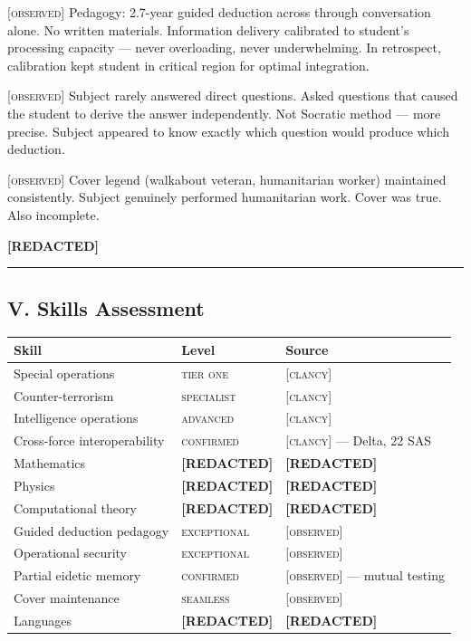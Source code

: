 \textsc{[observed]} Pedagogy: 2.7-year guided deduction across  through conversation alone. No written materials. Information delivery calibrated to student's processing capacity --- never overloading, never underwhelming. In retrospect, calibration kept student in critical region for optimal integration.

\textsc{[observed]} Subject rarely answered direct questions. Asked questions that caused the student to derive the answer independently. Not Socratic method --- more precise. Subject appeared to know exactly which question would produce which deduction.

\textsc{[observed]} Cover legend (walkabout veteran, humanitarian worker) maintained consistently. Subject genuinely performed humanitarian work. Cover was true. Also incomplete.

\textbf{[REDACTED]}

\vspace{1cm}\hrule\vspace{1cm}

\subsection*{V. Skills Assessment}
\label{record:hd-skills-assessment-2}

{%
\small
\begin{tabular}{p{4cm} p{3.5cm} p{6cm}}
\hline
\textbf{Skill} & \textbf{Level} & \textbf{Source} \\
\hline
Special operations & \textsc{tier one} & \textsc{[clancy]} \\
Counter-terrorism & \textsc{specialist} & \textsc{[clancy]} \\
Intelligence operations & \textsc{advanced} & \textsc{[clancy]} \\
Cross-force interoperability & \textsc{confirmed} & \textsc{[clancy]} --- Delta, 22 SAS \\
Mathematics & \textbf{[REDACTED]} & \textbf{[REDACTED]} \\
Physics & \textbf{[REDACTED]} & \textbf{[REDACTED]} \\
Computational theory & \textbf{[REDACTED]} & \textbf{[REDACTED]} \\
Guided deduction pedagogy & \textsc{exceptional} & \textsc{[observed]} \\
Operational security & \textsc{exceptional} & \textsc{[observed]} \\
Partial eidetic memory & \textsc{confirmed} & \textsc{[observed]} --- mutual testing \\
Cover maintenance & \textsc{seamless} & \textsc{[observed]} \\
Languages & \textbf{[REDACTED]} & \textbf{[REDACTED]} \\
\hline
\end{tabular}
}%

